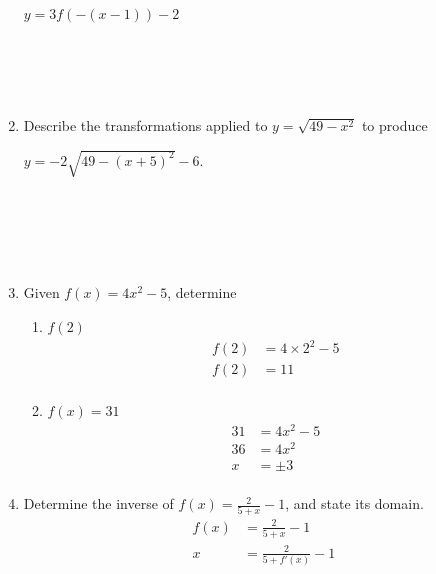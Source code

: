 \documentclass[paper=a4, fontsize=11pt]{scrartcl}
\begin{document}
\begin{enumerate}[resume]
        \begin{center}
            $y=3f(-(x-1))-2$\\ %
            \\
            \\
            \\
            \\
        \end{center}
        \item Describe the transformations applied to $y=\sqrt{49-x^2}$ to produce 
        
        $y=-2\sqrt{49-(x+5)^2}-6$.
        \begin{center}
            \\
            \\
            \\
            \\
        \end{center}
        \item Given $f(x)=4x^2-5$, determine
        \begin{enumerate}
            \item $f(2)$
            \begin{align*}
                f(2)&=4\times 2^2-5\\
                f(2)&=11\\
            \end{align*}
            \item $f(x)=31$
            \begin{align*}
                31&=4x^2-5\\
                36&=4x^2\\
                x&=\pm 3\\
            \end{align*}
        \end{enumerate}
        \item Determine the inverse of $f(x)=\frac{2}{5+x}-1$, and state its domain.
        \begin{align*}
            f(x)&=\frac{2}{5+x}-1\\
            x&=\frac{2}{5+f'(x)}-1\\

\end{align*}
\end{enumerate}
\end{document}
